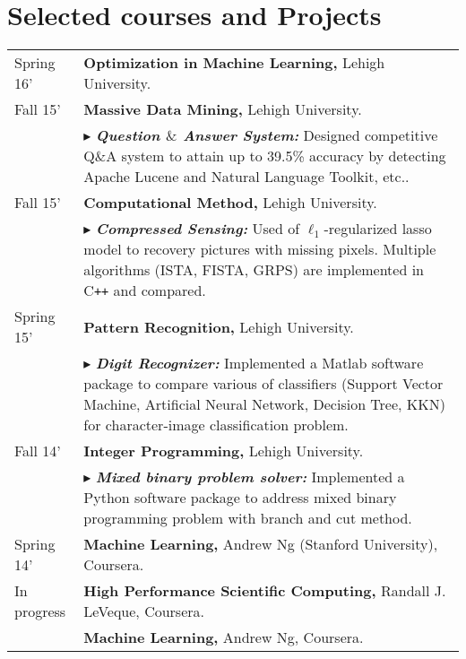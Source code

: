 \documentclass[letters,11pt]{article} %
\newcommand{\lst}[1]{\quad\footnotesize{$\blacktriangleright$ #1.}}
\begin{document}
\section{Selected courses and Projects}
\begin{longtable}{>{\centering}p{3.3cm}|p{14cm}}
    Spring 16'& \textbf{Optimization in Machine Learning,} Lehigh University.\\
    Fall 15'& \textbf{Massive Data Mining,} Lehigh University.\\
    &\lst{\textbf{\emph{Question $\mbox{\&}$ Answer System:}} Designed competitive Q$\mbox{\&}$A system to attain up to 39.5\% accuracy by detecting Apache Lucene and Natural Language Toolkit, etc.}\\
    Fall 15'& \textbf{Computational Method,} Lehigh University.\\
    &\lst{\textbf{\emph{Compressed Sensing:}} Used of $\ell_1$-regularized lasso model to recovery pictures with missing pixels. Multiple algorithms (ISTA, FISTA, GRPS) are implemented in C\texttt{++} and compared}\\
    Spring 15'& \textbf{Pattern Recognition,} Lehigh University.\\
    & \lst{\textbf{\emph{Digit Recognizer:}} Implemented a Matlab software package to compare various of classifiers (Support Vector Machine, Artificial Neural Network, Decision Tree, KKN) for character-image classification problem}\\
    Fall 14'& \textbf{Integer Programming,} Lehigh University.\\
    &\lst{\textbf{\emph{Mixed binary problem solver:}} Implemented a Python software package to address mixed binary programming problem with branch and cut method}\\
    Spring 14'& \textbf{Machine Learning,} Andrew Ng (Stanford University), Coursera.\\
    In progress&\textbf{High Performance Scientific Computing,} Randall J. LeVeque, Coursera.\\
    &\textbf{Machine Learning,} Andrew Ng, Coursera.
\end{longtable}
\end{document}
